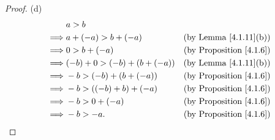 \begin{proof}{(d)}
    \begin{align*}
                 & a > b                                                              \\
        \implies & a + (-a) > b + (-a)          & \text{(by Lemma \ref{4.1.11}(b))}   \\
        \implies & 0 > b + (-a)                 & \text{(by Proposition \ref{4.1.6})} \\
        \implies & (-b) + 0 > (-b) + (b + (-a)) & \text{(by Lemma \ref{4.1.11}(b))}   \\
        \implies & -b > (-b) + (b + (-a))       & \text{(by Proposition \ref{4.1.6})} \\
        \implies & -b > ((-b) + b) + (-a)       & \text{(by Proposition \ref{4.1.6})} \\
        \implies & -b > 0 + (-a)                & \text{(by Proposition \ref{4.1.6})} \\
        \implies & -b > -a.                     & \text{(by Proposition \ref{4.1.6})} \\
    \end{align*}
\end{proof}

